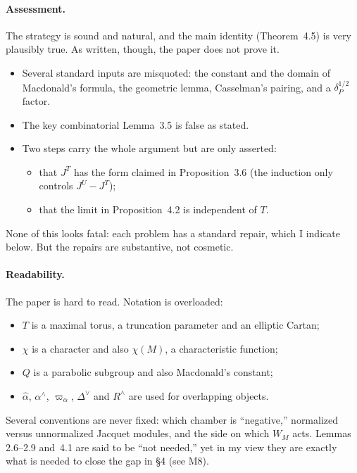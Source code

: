 \documentclass[11pt]{article}
\begin{document}
\paragraph{Assessment.} The strategy is sound and natural, and the main identity (Theorem~4.5) is very plausibly true. As written, though, the paper does not prove it.
\begin{itemize}
\item Several standard inputs are misquoted: the constant and the domain of Macdonald's formula, the geometric lemma, Casselman's pairing, and a $\delta_P^{1/2}$ factor.
\item The key combinatorial Lemma~3.5 is false as stated.
\item Two steps carry the whole argument but are only asserted:
  \begin{itemize}
  \item that $J^T$ has the form claimed in Proposition~3.6 (the induction only controls $J^U-J^T$);
  \item that the limit in Proposition~4.2 is independent of $T$.
  \end{itemize}
\end{itemize}
None of this looks fatal: each problem has a standard repair, which I indicate below. But the repairs are substantive, not cosmetic.

\paragraph{Readability.} The paper is hard to read. Notation is overloaded:
\begin{itemize}
\item $T$ is a maximal torus, a truncation parameter and an elliptic Cartan;
\item $\chi$ is a character and also $\chi(M)$, a characteristic function;
\item $Q$ is a parabolic subgroup and also Macdonald's constant;
\item $\hat\alpha$, $\alpha^\wedge$, $\varpi_\alpha$, $\Delta^\vee$ and $R^\wedge$ are used for overlapping objects.
\end{itemize}
Several conventions are never fixed: which chamber is ``negative,'' normalized versus unnormalized Jacquet modules, and the side on which $W_M$ acts. Lemmas 2.6--2.9 and~4.1 are said to be ``not needed,'' yet in my view they are exactly what is needed to close the gap in \S4 (see M8).
\end{document}
